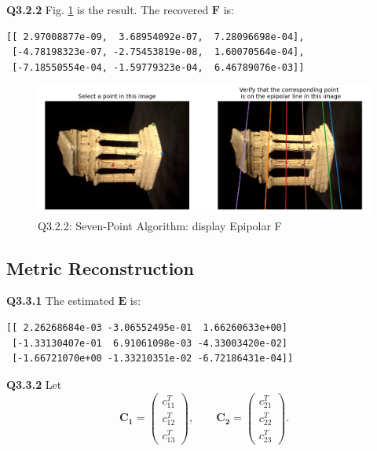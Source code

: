 \documentclass[
  course = {{16-720B Computer Vision}},
  quartile = {{1}},
  assignment = 5\ -\ 3D\ Reconstruction\ \&\ Photometric\ Stereo,
  name = {{Kangle Deng}},
  email = {{kangled@andrew.cmu.edu}},
  firstexercise = 1
]{aga-homework}
\begin{document}
\noindent\textbf{Q3.2.2}
Fig. \ref{fig:cv_hw5_q322} is the result. The recovered $\mathbf{F}$ is:
\begin{verbatim}
[[ 2.97008877e-09,  3.68954092e-07,  7.28096698e-04],
 [-4.78198323e-07, -2.75453819e-08,  1.60070564e-04],
 [-7.18550554e-04, -1.59779323e-04,  6.46789076e-03]]
\end{verbatim}

\begin{figure}
    \centering
    \includegraphics[width=.9\textwidth]{CV/fig/hw5/q3_2_2.png}
    \caption{Q3.2.2: Seven-Point Algorithm:  display Epipolar F}
    \label{fig:cv_hw5_q322}
\end{figure}

\subsection{Metric Reconstruction}
\noindent\textbf{Q3.3.1} The estimated $\mathbf{E}$ is:
\begin{verbatim}
[[ 2.26268684e-03 -3.06552495e-01  1.66260633e+00]
 [-1.33130407e-01  6.91061098e-03 -4.33003420e-02]
 [-1.66721070e+00 -1.33210351e-02 -6.72186431e-04]]
\end{verbatim}

\noindent\textbf{Q3.3.2} Let
\begin{equation*}
    \mathbf{C_1} = \left(\begin{array}{c}
         c_{11}^T \\
         c_{12}^T \\
         c_{13}^T
    \end{array}\right), \qquad \mathbf{C_2} = \left(\begin{array}{c}
         c_{21}^T \\
         c_{22}^T \\
         c_{23}^T
    \end{array}\right).
\end{equation*}
\end{document}
